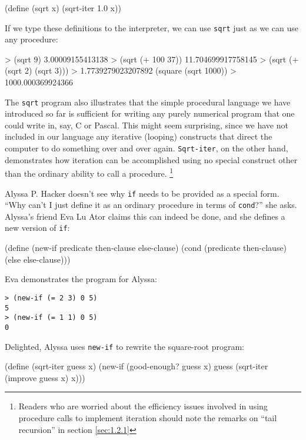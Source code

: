 \begin{schemedisplay}
\begin{schemedisplay}
(define (sqrt x)
  (sqrt-iter 1.0 x))
\end{schemedisplay}

If we type these definitions to the interpreter, we can use \texttt{sqrt}
just as we can use any procedure:

\begin{schemedisplay}
> (sqrt 9)
3.00009155413138
> (sqrt (+ 100 37))
11.704699917758145
> (sqrt (+ (sqrt 2) (sqrt 3)))
> 1.7739279023207892
(square (sqrt 1000))
> 1000.000369924366
\end{schemedisplay}

The \texttt{sqrt} program also illustrates that the simple procedural
language we have introduced so far is sufficient for writing any
purely numerical program that one could write in, say, C or Pascal.
This might seem surprising, since we have not included in our language
any iterative (looping) constructs that direct the computer to do
something over and over again.  \texttt{Sqrt-iter}, on the other hand,
demonstrates how iteration can be accomplished using no special
construct other than the ordinary ability to call a procedure.
\footnote{Readers who are worried about the efficiency issues involved
  in using procedure calls to implement iteration should note the
  remarks on ``tail recursion'' in section \ref{sec:1.2.1}}

\begin{Exercise}
\label{exc:1.6}
Alyssa P. Hacker doesn't see why \texttt{if} needs to be provided as a
special form.  ``Why can't I just define it as an ordinary procedure
in terms of \texttt{cond}?'' she asks.  Alyssa's friend Eva Lu Ator
claims this can indeed be done, and she defines a new version of
\texttt{if}:
\begin{schemedisplay}
(define (new-if predicate then-clause else-clause)
  (cond (predicate then-clause)
        (else else-clause)))
\end{schemedisplay}

Eva demonstrates the program for Alyssa:

\begin{verbatim}
> (new-if (= 2 3) 0 5)
5
> (new-if (= 1 1) 0 5)
0
\end{verbatim}

Delighted, Alyssa uses \texttt{new-if} to rewrite the square-root
program:

\begin{schemedisplay}
(define (sqrt-iter guess x)
  (new-if (good-enough? guess x)
          guess
          (sqrt-iter (improve guess x)
                     x)))
\end{schemedisplay}


\end{Exercise}
\end{schemedisplay}
